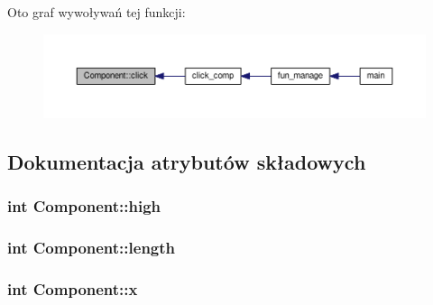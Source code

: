 Oto graf wywoływań tej funkcji\+:\nopagebreak
\begin{figure}[H]
\begin{center}
\leavevmode
\includegraphics[width=350pt]{classComponent_a247f6f0204b68a7efb9059cf709fe6ea_icgraph}
\end{center}
\end{figure}




\subsection{Dokumentacja atrybutów składowych}
\subsubsection[{\texorpdfstring{high}{high}}]{\setlength{\rightskip}{0pt plus 5cm}int Component\+::high\hspace{0.3cm}{\ttfamily [protected]}}\hypertarget{classComponent_aff8a286217041306964f2207b86522b3}{}\label{classComponent_aff8a286217041306964f2207b86522b3}
\subsubsection[{\texorpdfstring{length}{length}}]{\setlength{\rightskip}{0pt plus 5cm}int Component\+::length\hspace{0.3cm}{\ttfamily [protected]}}\hypertarget{classComponent_a4d25a50d4bfa8fde7f75478eadcd5661}{}\label{classComponent_a4d25a50d4bfa8fde7f75478eadcd5661}
\subsubsection[{\texorpdfstring{x}{x}}]{\setlength{\rightskip}{0pt plus 5cm}int Component\+::x\hspace{0.3cm}{\ttfamily [protected]}}\hypertarget{classComponent_a3fe84cea3e41ac363349595e1a92a5b6}{}\label{classComponent_a3fe84cea3e41ac363349595e1a92a5b6}
